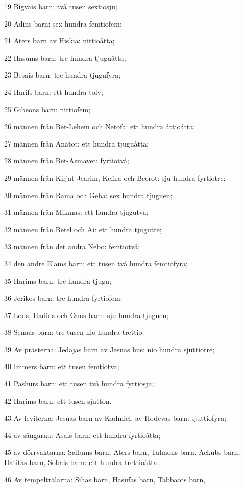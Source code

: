 \par 19 Bigvais barn: två tusen sextiosju;
\par 20 Adins barn: sex hundra femtiofem;
\par 21 Aters barn av Hiskia: nittioåtta;
\par 22 Hasums barn: tre hundra tjuguåtta;
\par 23 Besais barn: tre hundra tjugufyra;
\par 24 Harifs barn: ett hundra tolv;
\par 25 Gibeons barn: nittiofem;
\par 26 männen från Bet-Lehem och Netofa: ett hundra åttioåtta;
\par 27 männen från Anatot: ett hundra tjuguåtta;
\par 28 männen från Bet-Asmavet: fyrtiotvå;
\par 29 männen från Kirjat-Jearim, Kefira och Beerot: sju hundra fyrtiotre;
\par 30 männen från Rama och Geba: sex hundra tjuguen;
\par 31 männen från Mikmas: ett hundra tjugutvå;
\par 32 männen från Betel och Ai: ett hundra tjugutre;
\par 33 männen från det andra Nebo: femtiotvå;
\par 34 den andre Elams barn: ett tusen två hundra femtiofyra;
\par 35 Harims barn: tre hundra tjugu;
\par 36 Jerikos barn: tre hundra fyrtiofem;
\par 37 Lods, Hadids och Onos barn: sju hundra tjuguen;
\par 38 Senaas barn: tre tusen nio hundra trettio.
\par 39 Av prästerna: Jedajas barn av Jesuas hus: nio hundra sjuttiotre;
\par 40 Immers barn: ett tusen femtiotvå;
\par 41 Pashurs barn: ett tusen två hundra fyrtiosju;
\par 42 Harims barn: ett tusen sjutton.
\par 43 Av leviterna: Jesuas barn av Kadmiel, av Hodevas barn: sjuttiofyra;
\par 44 av sångarna: Asafs barn: ett hundra fyrtioåtta;
\par 45 av dörrvaktarna: Sallums barn, Aters barn, Talmons barn, Ackubs barn, Hatitas barn, Sobais barn: ett hundra trettioåtta.
\par 46 Av tempelträlarna: Sihas barn, Hasufas barn, Tabbaots barn,
